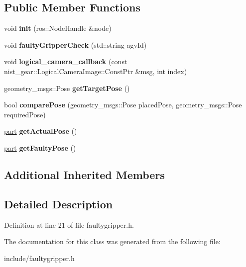 \subsection*{Public Member Functions}
\begin{DoxyCompactItemize}
\item 
\mbox{\label{classFaultyGripper_ab23e81665068d57e20c44e3ccd516ba5}} 
void {\bfseries init} (ros\+::\+Node\+Handle \&node)
\item 
\mbox{\label{classFaultyGripper_a85df189f3bf89f6fa46fea278c8d1a6d}} 
void {\bfseries faulty\+Gripper\+Check} (std\+::string agv\+Id)
\item 
\mbox{\label{classFaultyGripper_a4f678232091485ea5706e7cca3fee506}} 
void {\bfseries logical\+\_\+camera\+\_\+callback} (const nist\+\_\+gear\+::\+Logical\+Camera\+Image\+::\+Const\+Ptr \&msg, int index)
\item 
\mbox{\label{classFaultyGripper_a503df0f795bdc5471c2172f15cf0ddab}} 
geometry\+\_\+msgs\+::\+Pose {\bfseries get\+Target\+Pose} ()
\item 
\mbox{\label{classFaultyGripper_aebf174b64549a80ea9a615a2373c8990}} 
bool {\bfseries compare\+Pose} (geometry\+\_\+msgs\+::\+Pose placed\+Pose, geometry\+\_\+msgs\+::\+Pose required\+Pose)
\item 
\mbox{\label{classFaultyGripper_a074686c338018ca5384d15586dcd68a6}} 
\hyperlink{structPart}{part} {\bfseries get\+Actual\+Pose} ()
\item 
\mbox{\label{classFaultyGripper_afa9709d319a00318d576efae11f05071}} 
\hyperlink{structPart}{part} {\bfseries get\+Faulty\+Pose} ()
\end{DoxyCompactItemize}
\subsection*{Additional Inherited Members}


\subsection{Detailed Description}


Definition at line 21 of file faultygripper.\+h.



The documentation for this class was generated from the following file\+:\begin{DoxyCompactItemize}
\item 
include/faultygripper.\+h\end{DoxyCompactItemize}
